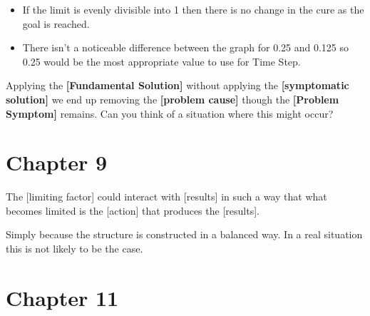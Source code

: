 \documentclass[]{memoir}
\newcommand{\p}[1]{\textbf{{[}#1{]}}}
\begin{document}

\begin{itemize}
\itemsep1pt\parskip0pt
\item
  If the limit is evenly divisible into 1 then there is no change in the
  cure as the goal is reached.
\item
  There isn't a noticeable difference between the graph for 0.25 and
  0.125 so 0.25 would be the most appropriate value to use for Time
  Step.
\end{itemize}


Applying the \p{Fundamental Solution} without applying the
\p{symptomatic solution} we end up removing the \p{problem cause} though
the \p{Problem Symptom} remains. Can you think of a situation where this
might occur?

\section{Chapter 9}


The {[}limiting factor{]} could interact with {[}results{]} in such a
way that what becomes limited is the {[}action{]} that produces the
{[}results{]}.


Simply because the structure is constructed in a balanced way. In a real
situation this is not likely to be the case.

\section{Chapter 11}
\end{document}
